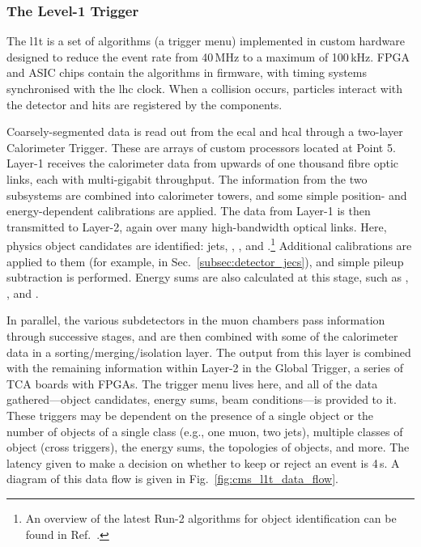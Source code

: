 
\subsubsection{The Level-1 Trigger}
\label{subsubsec:detector_l1t}

The \acrlong{l1t} is a set of algorithms (a trigger menu) implemented in custom hardware designed to reduce the event rate from 40\,MHz to a maximum of 100\,kHz. FPGA and ASIC chips contain the algorithms in firmware, with timing systems synchronised with the \acrshort{lhc} clock. When a collision occurs, particles interact with the detector and hits are registered by the components.

Coarsely-segmented data is read out from the \acrshort{ecal} and \acrshort{hcal} through a two-layer Calorimeter Trigger. These are arrays of custom processors located at Point 5. Layer-1 receives the calorimeter data from upwards of one thousand fibre optic links, each with multi-gigabit throughput. The information from the two subsystems are combined into calorimeter towers, and some simple position- and energy-dependent calibrations are applied. The data from Layer-1 is then transmitted to Layer-2, again over many high-bandwidth optical links. Here, physics object candidates are identified: \glspl{jet}, \Pe, \Pphoton, and \Ptau.\footnote{An overview of the latest Run-2 algorithms for object identification can be found in Ref.~.} Additional calibrations are applied to them (for example, in Sec.~\ref{subsec:detector_jecs}), and simple \gls{pileup} subtraction is performed. Energy sums are also calculated at this stage, such as \etmiss, \HT, and \mht.

In parallel, the various subdetectors in the muon chambers pass information through successive stages, and are then combined with some of the calorimeter data in a sorting/merging/isolation layer. The output from this layer is combined with the remaining information within Layer-2 in the Global Trigger, a series of \si{\micro}TCA boards with FPGAs. The trigger menu lives here, and all of the data gathered---object candidates, energy sums, beam conditions---is provided to it. These triggers may be dependent on the presence of a single object or the number of objects of a single class (e.g., one muon, two \glspl{jet}), multiple classes of object (cross triggers), the energy sums, the topologies of objects, and more. The latency given to make a decision on whether to keep or reject an event is 4\,\si{\micro}s. A diagram of this data flow is given in Fig.~\ref{fig:cms_l1t_data_flow}.

